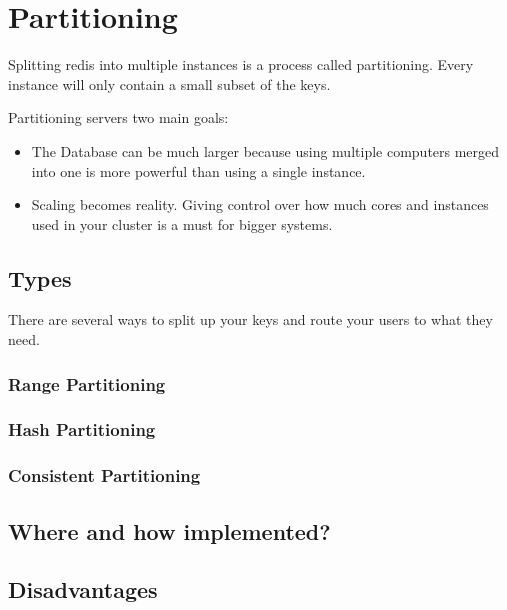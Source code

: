 \chapter{Partitioning}

Splitting redis into multiple instances is a process called partitioning. Every instance will only contain a small subset of the keys.

Partitioning servers two main goals:
\begin{itemize}
\item The Database can be much larger because using multiple computers merged into one is more powerful than using a single instance.
\item Scaling becomes reality. Giving control over how much cores and instances used in your cluster is a must for bigger systems.
\end{itemize}

\section{Types}
There are several ways to split up your keys and route your users to what they need.

\subsection{Range Partitioning}
\subsection{Hash Partitioning}
\subsection{Consistent Partitioning}

\section{Where and how implemented?}

\section{Disadvantages}